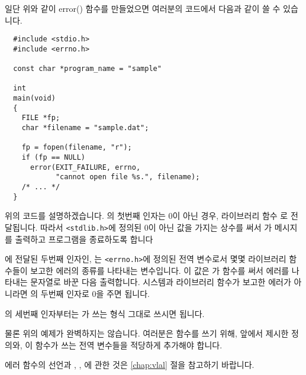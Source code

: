\begin{faq}
	\noindent 일단 위와 같이 error() 함수를 만들었으면 여러분의
	코드에서 다음과 같이 쓸 수 있습니다.

\begin{verbatim}
  #include <stdio.h>
  #include <errno.h>

  const char *program_name = "sample"

  int
  main(void)
  {
    FILE *fp;
    char *filename = "sample.dat";

    fp = fopen(filename, "r");
    if (fp == NULL)
      error(EXIT_FAILURE, errno, 
            "cannot open file %s.", filename);
    /* ... */
  }
\end{verbatim}

	\noindent 위의 코드를 설명하겠습니다.
        의 첫번째 인자는 0이 아닌 경우, 
	라이브러리 함수 로 전달됩니다.  따라서 
	\verb+<stdlib.h>+에 정의된 0이 아닌 값을 가지는 
	 상수를 써서 가 메시지를
	출력하고 프로그램을 종료하도록 합니다

	에 전달된 두번째 인자인, 
        는 \verb+<errno.h>+에 정의된 전역 변수로서
        몇몇 라이브러리 함수들이 보고한 에러의 종류를 나타내는
	변수입니다.  이 값은 가  함수를
        써서 에러를 나타내는 문자열로 바꾼 다음 출력합니다.
        시스템과 라이브러리 함수가 보고한 에러가 아니라면
	의 두번째 인자로 0을 주면 됩니다.

	의 세번째 인자부터는 가 쓰는
	형식 그대로 쓰시면 됩니다.

	물론 위의 예제가 완벽하지는 않습니다.  여러분은 
	함수를 쓰기 위해, 앞에서 제시한  정의와,
	이 함수가 쓰는 전역 변수들을 적당하게 추가해야 합니다.
	
	에러 함수의 선언과 , , 에
	관한 것은 \ref{chap:vlal} 절을 참고하기 바랍니다.

\R
	\cite{glibc} 
\end{faq}

